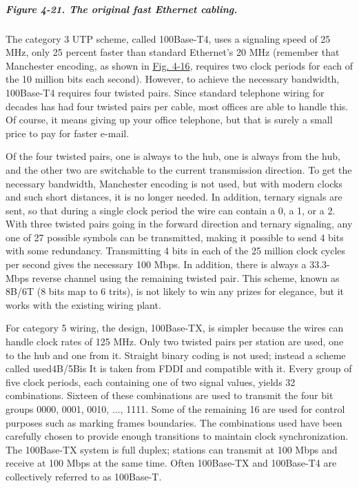 \subparagraph[Figure 4-21. The original fast Ethernet
cabling.]{\texorpdfstring{\protect\hypertarget{0130661023_ch04lev1sec3.htmlux5cux23ch04fig21}{}{}Figure
4-21. The original fast Ethernet
cabling.}{Figure 4-21. The original fast Ethernet cabling.}}


The category 3 UTP scheme, called {100Base-T4}, uses a signaling speed
of 25 MHz, only 25 percent faster than standard Ethernet's 20 MHz
(remember that Manchester encoding, as shown in
\protect\hyperlink{0130661023_ch04lev1sec3.htmlux5cux23ch04fig16}{Fig.
4-16}, requires two clock periods for each of the 10 million bits each
second). However, to achieve the necessary bandwidth, 100Base-T4
requires four twisted pairs. Since standard telephone wiring for decades
has had four twisted pairs per cable, most offices are able to handle
this. Of course, it means giving up your office telephone, but that is
surely a small price to pay for faster e-mail.

Of the four twisted pairs, one is always to the hub, one is always from
the hub, and the other two are switchable to the current transmission
direction. To get the necessary bandwidth, Manchester encoding is not
used, but with modern clocks and such short distances, it is no longer
needed. In addition, ternary signals are sent, so that during a single
clock period the wire can contain a 0, a 1, or a 2. With three twisted
pairs going in the forward direction and ternary signaling, any one of
27 possible symbols can be transmitted, making it possible to send 4
bits with some redundancy. Transmitting 4 bits in each of the 25 million
clock cycles per second gives the necessary 100 Mbps. In addition, there
is always a 33.3-Mbps reverse channel using the remaining twisted pair.
This scheme, known as {8B/6T} (8 bits map to 6 trits), is not likely to
win any prizes for elegance, but it works with the existing wiring
plant.

For category 5 wiring, the design, {100Base-TX}, is simpler because the
wires can handle clock rates of 125 MHz. Only two twisted pairs per
station are used, one to the hub and one from it. Straight binary coding
is not used; instead a scheme called used{4B/5B}is It is taken from FDDI
and compatible with it. Every group of five clock periods, each
containing one of two signal values, yields 32 combinations. Sixteen of
these combinations are used to transmit the four bit groups 0000, 0001,
0010, ..., 1111. Some of the remaining 16 are used for control purposes
such as marking frames boundaries. The combinations used have been
carefully chosen to provide enough transitions to maintain clock
synchronization. The 100Base-TX system is full duplex; stations can
transmit at 100 Mbps and receive at 100 Mbps at the same time. Often
100Base-TX and 100Base-T4 are collectively referred to as {100Base-T}.

